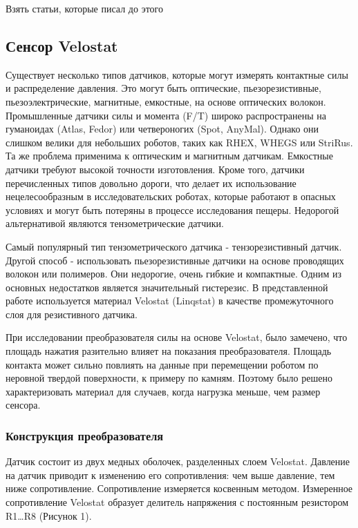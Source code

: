 
Взять статьи, которые писал до этого


\subsection{Сенсор
Velostat}

Существует несколько типов датчиков, которые могут измерять контактные
силы и распределение давления. Это могут быть оптические,
пьезорезистивные, пьезоэлектрические, магнитные, емкостные, на основе
оптических волокон. Промышленные датчики силы и момента (F/T) широко
распространены на гуманоидах (Atlas, Fedor) или четвероногих (Spot,
AnyMal). Однако они слишком велики для небольших роботов, таких как
RHEX, WHEGS или StriRus. Та же проблема применима к оптическим и
магнитным датчикам. Емкостные датчики требуют высокой точности
изготовления. Кроме того, датчики перечисленных типов довольно дороги,
что делает их использование нецелесообразным в исследовательских
роботах, которые работают в опасных условиях и могут быть потеряны в
процессе исследования пещеры. Недорогой альтернативой являются
тензометрические датчики.

Самый популярный тип тензометрического датчика - тензорезистивный
датчик. Другой способ - использовать пьезорезистивные датчики на основе
проводящих волокон или полимеров. Они недорогие, очень гибкие и
компактные. Одним из основных недостатков является значительный
гистерезис. В представленной работе используется материал Velostat
(Linqstat) в качестве промежуточного слоя для резистивного датчика.

При исследовании преобразователя силы на основе Velostat, было замечено,
что площадь нажатия разительно влияет на показания преобразователя.
Площадь контакта может сильно повлиять на данные при перемещении роботом
по неровной твердой поверхности, к примеру по камням. Поэтому было
решено характеризовать материал для случаев, когда нагрузка меньше, чем
размер сенсора.


\subsubsection{Конструкция
преобразователя}

Датчик состоит из двух медных оболочек, разделенных слоем Velostat.
Давление на датчик приводит к изменению его сопротивления: чем выше
давление, тем ниже сопротивление. Сопротивление измеряется косвенным
методом. Измеренное сопротивление Velostat образует делитель напряжения
с постоянным резистором R1\ldots R8 (Рисунок 1).

